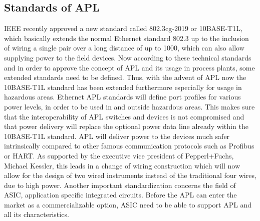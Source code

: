 \documentclass[conference]{IEEEtran}
\begin{document}
\subsection{Standards of APL}
IEEE recently approved a new standard called 802.3cg-2019 or 10BASE-T1L, which basically extends the normal Ethernet standard 802.3 up to the inclusion of wiring a single pair over a long distance of up to 1000, which can also allow supplying power to the field devices. Now according to these technical standards and in order to approve the concept of APL and its usage in process plants, some extended standards need to be defined. Thus, with the advent of APL now the 10BASE-T1L standard has been extended furthermore especially for usage in hazardous areas.
Ethernet APL standards will define port profiles for various power levels, in order to be used in and outside hazardous areas. This makes sure that the interoperability of APL switches and devices is not compromised and that power delivery will replace the optional power data line already within the 10BASE-T1L standard.
APL will deliver power to the devices much safer intrinsically compared to other famous communication protocols such as Profibus or HART. As supported by the executive vice president of Pepperl+Fuchs, Michael Kessler, this leads in a change of wiring construction which will now allow for the design of two wired instruments instead of the traditional four wires, due to high power.
Another important standardization concerns the field of ASIC, application specific integrated circuits. Before the APL can enter the market as a commercializable option, ASIC need to be able to support APL and all its characteristics. \cite{b6}
\end{document}
